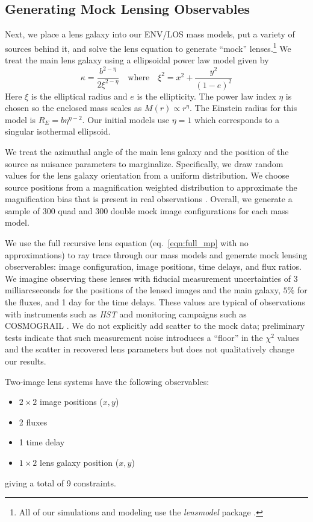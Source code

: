 \documentclass{emulateapj}
\begin{document}
\subsection{Generating Mock Lensing Observables} \label{sec:observables}

Next, we place a lens galaxy into our ENV/LOS mass models, put a variety of sources behind it, and solve the lens equation to generate ``mock'' lenses.\footnote{All of our simulations and modeling use the \emph{lensmodel} package \citep{Keeton01}.}  We treat the main lens galaxy using a ellipsoidal power law model given by
\begin{equation}
\label{eqn:powerlaw}
\kappa = \frac{b^{2-\eta}}{2 \xi^{2-\eta}}
\quad\mbox{where}\quad
\xi^2 = x^2 + \frac{y^2}{(1-e)^2}
\end{equation}
Here $\xi$ is the elliptical radius and $e$ is the ellipticity.  The power law index $\eta$ is chosen so the enclosed mass scales as $M(r) \propto r^\eta$.
The Einstein radius for this model is $R_E = b \eta^{\eta - 2}$. Our initial models use $\eta = 1$ which corresponds to a singular isothermal ellipsoid.

We treat the azimuthal angle of the main lens galaxy and the position of the source as nuisance parameters to marginalize.  Specifically, we draw random values for the lens galaxy orientation from a uniform distribution.  We choose source positions from a magnification weighted distribution to approximate the magnification bias that is present in real observations \citep[see][]{Keeton04}. Overall, we generate a sample of 300 quad and 300 double mock image configurations for each mass model.

We use the full recursive lens equation (eq.\ \ref{eqn:full_mp} with no approximations) to ray trace through our mass models and generate mock lensing observerables: image configuration, image positions, time delays, and flux ratios. We imagine observing these lenses with fiducial measurement uncertainties of 3 milliarcseconds for the positions of the lensed images and the main galaxy, $5\%$ for the fluxes, and 1 day for the time delays. These values are typical of observations with instruments such as \emph{HST} and monitoring campaigns such as COSMOGRAIL \citep{Eigenbrod05}. We do not explicitly add scatter to the mock data; preliminary tests indicate that such measurement noise introduces a ``floor'' in the $\chi^2$ values and the scatter in recovered lens parameters but does not qualitatively change our results.

Two-image lens systems have the following observables:
\begin{itemize}
\item $2\times 2$ image  positions ($x,y$)
\item 2 fluxes
\item 1 time delay 
\item $1\times 2$ lens galaxy position ($x,y$)
\end{itemize}
giving a total of 9 constraints.
\end{document}
